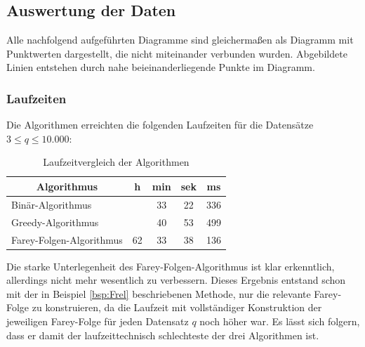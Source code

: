 \subsection{Auswertung der Daten}
Alle nachfolgend aufgeführten Diagramme sind gleichermaßen als Diagramm mit Punktwerten dargestellt, die nicht miteinander verbunden wurden. Abgebildete Linien entstehen durch nahe beieinanderliegende Punkte im Diagramm.


\subsubsection{Laufzeiten}
Die Algorithmen erreichten die folgenden Laufzeiten für die Datensätze $3 \leq q \leq 10.000$:\\
\begin{table}[H]
	\centering
	\begin{tabular}{|l | c c c c|}
		\hline
		\multicolumn{1}{|c|}{\textbf{Algorithmus}} & h & min & sek & ms \\ \hline
		Binär-Algorithmus & & 33 & 22 & 336 \\ \hline
		Greedy-Algorithmus & & 40 &  53 & 499 \\ \hline
		Farey-Folgen-Algorithmus & 62 & 33 & 38 & 136 \\ \hline
	\end{tabular}
	\caption{Laufzeitvergleich der Algorithmen}
	\label{table:LaufzeitVgl}
\end{table}
Die starke Unterlegenheit des Farey-Folgen-Algorithmus ist klar erkenntlich, allerdings nicht mehr wesentlich zu verbessern. Dieses Ergebnis entstand schon mit der in Beispiel \ref{bsp:Frel} beschriebenen Methode, nur die relevante Farey-Folge zu konstruieren, da die Laufzeit mit vollständiger Konstruktion der jeweiligen Farey-Folge für jeden Datensatz $q$ noch höher war. Es lässt sich folgern, dass er damit der laufzeittechnisch schlechteste der drei Algorithmen ist.

